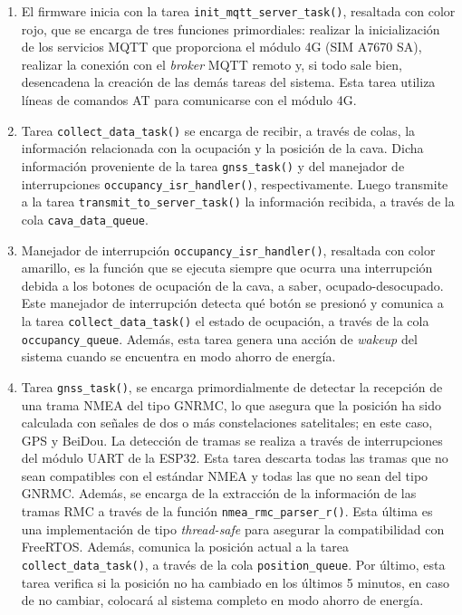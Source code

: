 \begin{enumerate}
	\item El firmware inicia con la tarea \verb|init_mqtt_server_task()|, resaltada con color rojo, que se encarga de tres funciones primordiales: realizar la inicialización de los servicios MQTT que proporciona el módulo 4G (SIM A7670 SA), realizar la conexión con el \textit{broker} MQTT remoto y, si todo sale bien, desencadena la creación de las demás tareas del sistema. Esta tarea utiliza líneas de comandos AT para comunicarse con el módulo 4G.
	
	\item Tarea \verb|collect_data_task()| se encarga de recibir, a través de colas, la información relacionada con la ocupación y la posición de la cava. Dicha información proveniente de la tarea \verb|gnss_task()| y del manejador de interrupciones \verb|occupancy_isr_handler()|, respectivamente. Luego transmite a la tarea \verb|transmit_to_server_task()| la información recibida, a través de la cola \verb|cava_data_queue|.
	
	\item Manejador de interrupción \verb|occupancy_isr_handler()|, resaltada con color amarillo, es la función que se ejecuta siempre que ocurra una interrupción debida a los botones de ocupación de la cava, a saber, ocupado-desocupado. Este manejador de interrupción detecta qué botón se presionó y comunica a la tarea \verb|collect_data_task()| el estado de ocupación, a través de la cola \verb|occupancy_queue|. Además, esta tarea genera una acción de \textit{wakeup} del sistema cuando se encuentra en modo ahorro de energía. 	
	
	\item Tarea \verb|gnss_task()|, se encarga primordialmente de detectar la recepción de una trama NMEA del tipo GNRMC, lo que asegura que la posición ha sido calculada con señales de dos o más constelaciones satelitales; en este caso, GPS y BeiDou. La detección de tramas se realiza a través de interrupciones del módulo UART de la ESP32. Esta tarea descarta todas las tramas que no sean compatibles con el estándar NMEA y todas las que no sean del tipo GNRMC. Además, se encarga de la extracción de la información de las tramas RMC a través de la función \verb|nmea_rmc_parser_r()|. Esta última es una implementación de tipo \textit{thread-safe} para asegurar la compatibilidad con FreeRTOS. Además, comunica la posición actual a la tarea \verb|collect_data_task()|, a través de la cola \verb|position_queue|. Por último, esta tarea verifica si la posición no ha cambiado en los últimos 5 minutos, en caso de no cambiar, colocará al sistema completo en modo ahorro de energía. 
		

\end{enumerate}
